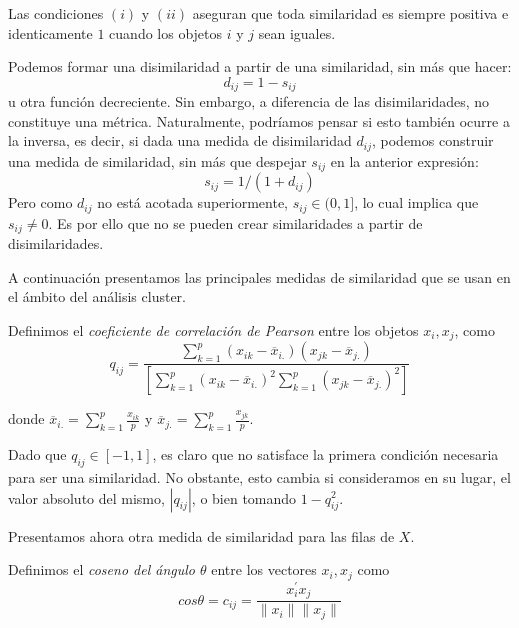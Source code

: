 Las condiciones $(i)$ y $(ii)$ aseguran que toda similaridad es siempre positiva e identicamente $1$ cuando los objetos $i$ y $j$ sean iguales. \newline

\begin{observacion}
    Podemos formar una disimilaridad a partir de una similaridad, sin más que hacer:
    \[
    d_{ij} = 1 - s_{ij}
    \]
    u otra función decreciente. Sin embargo, a diferencia de las disimilaridades, no constituye una métrica. \newline
    Naturalmente, podríamos pensar si esto también ocurre a la inversa, es decir, si dada una medida de disimilaridad $d_{ij}$, podemos construir una medida de similaridad, sin más que 
    despejar $s_{ij}$ en la anterior expresión: 
    \[
    s_{ij} = 1/(1+d_{ij})
    \]
    Pero como $d_{ij}$ no está acotada superiormente, $s_{ij} \in (0,1]$, lo cual implica que $s_{ij} \neq 0$. Es por ello que no se pueden crear similaridades a partir de
    disimilaridades.
\end{observacion}

A continuación presentamos las principales medidas de similaridad que se usan en el ámbito del análisis cluster. \newline

\begin{definicion}
Definimos el \textit{coeficiente de correlación de Pearson} entre los objetos $x_{i},x_{j}$, como
\[
q_{ij} = \frac{\sum_{k=1}^{p}(x_{ik}-\overline{x}_{i.})(x_{jk}-\overline{x}_{j.})}{\left[\sum_{k=1}^{p}(x_{ik}-\overline{x}_{i.})^{2}\sum_{k=1}^{p}(x_{jk}-\overline{x}_{j.})^{2} \right]}
\]   
\end{definicion}

donde $\overline{x}_{i.} = \sum_{k=1}^{p}\frac{x_{ik}}{p}$ y $\overline{x}_{j.} = \sum_{k=1}^{p}\frac{x_{jk}}{p}$. \newline

\begin{observacion}
    Dado que $q_{ij} \in [-1,1]$, es claro que no satisface la primera condición necesaria para ser una similaridad. No obstante, esto cambia si consideramos en su lugar, el 
    valor absoluto del mismo, $|q_{ij}|$, o bien tomando $1-q_{ij}^{2}$. 
\end{observacion}

Presentamos ahora otra medida de similaridad para las filas de $X$.

\begin{definicion}
    Definimos el \textit{coseno del ángulo $\theta$} entre los vectores $x_{i},x_{j}$ como
    \[
    cos \theta = c_{ij} = \frac{x_{i}^{'}x_{j}}{\|x_{i}\| \|x_{j}\|}
    \]
\end{definicion}

